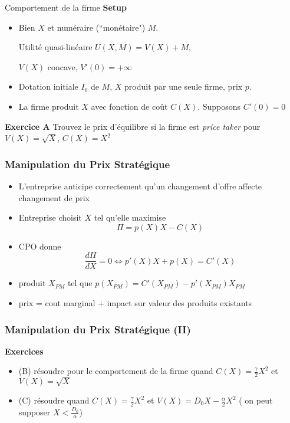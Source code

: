 \documentclass[handout]{beamer}
\newenvironment{iPar}[1]{\textbf{#1} \begin{itemize}}{\end{itemize}}
\newcommand{\mdp}{\medskip \pause}
\begin{document}
\begin{frame}{Comportement de la firme}
\begin{iPar}{Setup}
\item  Bien $X$ et numéraire (``monétaire") $M$.\smallskip

 Utilité quasi-linéaire $U(X,M) = V(X) + M$,
 
  $V(X)$ concave, $V'(0) = + \infty$
\item  Dotation initiale $I_0$ de $M$, $X$ produit par une seule firme, prix $p$. 
\item   La firme produit $X$ avec fonction de coût $C(X)$. Supposons $C'(0) = 0$
\end{iPar} \mdp 
\textbf{Exercice A} Trouvez le prix d'équilibre si la firme est \textit{price taker} pour $V(X) = \sqrt{X}$, $C(X) = X^2$
\end{frame}


\begin{frame}\frametitle{Manipulation du Prix Stratégique}

\begin{itemize} \item L'entreprise anticipe correctement qu'un changement d'offre affecte changement de prix
\item Entreprise choisit $X$ tel qu'elle maximise $$\Pi = p(X)X - C(X)$$
\item CPO donne $$\frac{d\Pi}{dX} = 0 \iff p'(X)X + p(X) = C'(X)$$
\item produit $X_{PM}$ tel que  $   p(X_{PM}) = C'(X_{PM}) - p'(X_{PM}) X_{PM} $ \mdp
\item prix  = cout marginal + impact sur valeur des produits existants\end{itemize}
\end{frame}



\begin{frame}\frametitle{Manipulation du Prix Stratégique (II)}

\textbf{Exercices} \begin{itemize} \item (B) résoudre pour le comportement de la firme quand $C(X) = \frac{\gamma}{2} X^2$ et  $V(X) = \sqrt X$
\item (C) résoudre quand  $C(X) = \frac{\gamma}{2} X^2$ et $V(X) = D_0 X - \frac{\alpha}{2} X^2$ ( on peut supposer $X < \frac{D_0}{\alpha}$) 

\end{itemize}
\end{frame}
\end{document}
